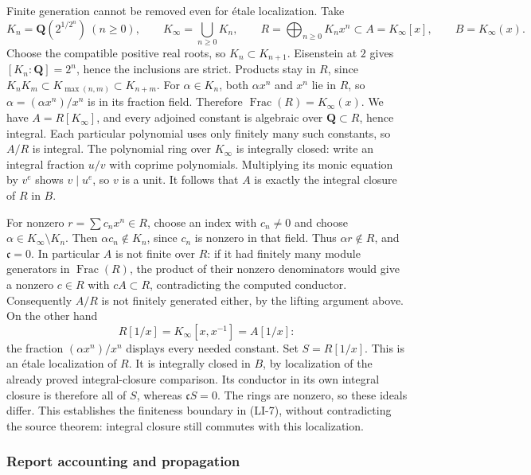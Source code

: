 Finite generation cannot be removed even for étale localization. Take \[
K_n=\mathbf Q(2^{1/2^n})\ (n\geq0),\qquad
K_\infty=\bigcup_{n\geq0}K_n,\qquad
R=\bigoplus_{n\geq0}K_nx^n\subset A=K_\infty[x],\qquad
B=K_\infty(x).
\] Choose the compatible positive real roots, so \(K_n\subset K_{n+1}\). Eisenstein at \(2\) gives \([K_n:\mathbf Q]=2^n\), hence the inclusions are strict. Products stay in \(R\), since \(K_nK_m\subset K_{\max(n,m)}\subset K_{n+m}\). For \(\alpha\in K_n\), both \(\alpha x^n\) and \(x^n\) lie in \(R\), so \(\alpha=(\alpha x^n)/x^n\) is in its fraction field. Therefore \(\operatorname{Frac}(R)=K_\infty(x)\). We have \(A=R[K_\infty]\), and every adjoined constant is algebraic over \(\mathbf Q\subset R\), hence integral. Each particular polynomial uses only finitely many such constants, so \(A/R\) is integral. The polynomial ring over \(K_\infty\) is integrally closed: write an integral fraction \(u/v\) with coprime polynomials. Multiplying its monic equation by \(v^e\) shows \(v\mid u^e\), so \(v\) is a unit. It follows that \(A\) is exactly the integral closure of \(R\) in \(B\).

For nonzero \(r=\sum c_nx^n\in R\), choose an index with \(c_n\ne0\) and choose \(\alpha\in K_\infty\setminus K_n\). Then \(\alpha c_n\notin K_n\), since \(c_n\) is nonzero in that field. Thus \(\alpha r\notin R\), and \(\mathfrak c=0\). In particular \(A\) is not finite over \(R\): if it had finitely many module generators in \(\operatorname{Frac}(R)\), the product of their nonzero denominators would give a nonzero \(c\in R\) with \(cA\subset R\), contradicting the computed conductor. Consequently \(A/R\) is not finitely generated either, by the lifting argument above. On the other hand \[
R[1/x]=K_\infty[x,x^{-1}]=A[1/x]:
\] the fraction \((\alpha x^n)/x^n\) displays every needed constant. Set \(S=R[1/x]\). This is an étale localization of \(R\). It is integrally closed in \(B\), by localization of the already proved integral-closure comparison. Its conductor in its own integral closure is therefore all of \(S\), whereas \(\mathfrak cS=0\). The rings are nonzero, so these ideals differ. This establishes the finiteness boundary in (LI-7), without contradicting the source theorem: integral closure still commutes with this localization.

\subsubsection{Report accounting and propagation}\label{algebra-proof-054-report-accounting-and-propagation}

